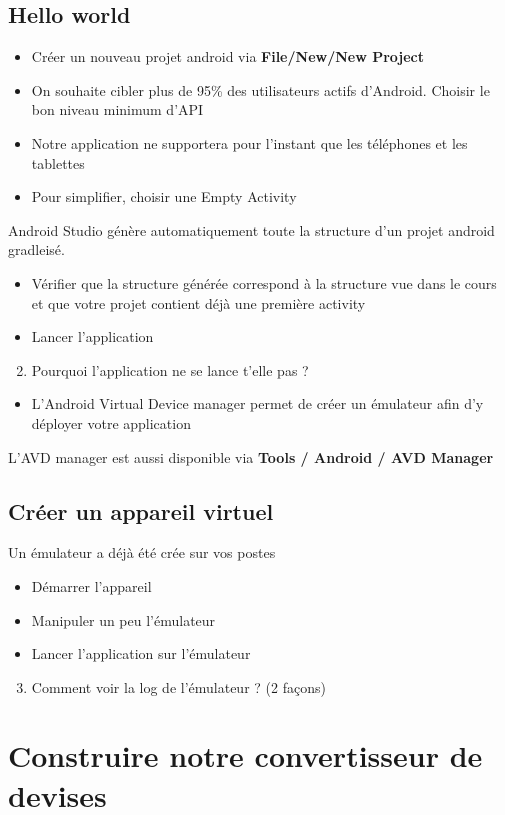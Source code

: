 \documentclass{article}
\begin{document}
\subsection{Hello world}
\begin{itemize}
\item Créer un nouveau projet android via \textbf{File/New/New Project}
\item On souhaite cibler plus de 95\% des utilisateurs actifs d'Android. Choisir
le bon niveau minimum d'API
\item Notre application ne supportera pour l'instant que les téléphones et les
tablettes
\item Pour simplifier, choisir une Empty Activity
\end{itemize}
Android Studio génère automatiquement toute la structure d'un projet android
gradleisé.
\begin{itemize}
\item Vérifier que la structure générée correspond à la structure vue dans le
cours et que votre projet contient déjà une première activity
\item Lancer l'application
\end{itemize}
\begin{enumerate}
 \setcounter{enumi}{1}
\item Pourquoi l'application ne se lance t'elle pas ?
\end{enumerate}
\begin{itemize}
\item L'Android Virtual Device manager permet de créer un émulateur afin d'y
déployer votre application
\end{itemize}
L'AVD manager est aussi disponible via \textbf{Tools / Android / AVD Manager}
\subsection{Créer un appareil virtuel}
Un émulateur a déjà été crée sur vos postes
\begin{itemize}
\item Démarrer l'appareil
\item Manipuler un peu l'émulateur
\item Lancer l'application sur l'émulateur
\end{itemize}
\begin{enumerate}
 \setcounter{enumi}{2}
\item Comment voir la log de l'émulateur ? (2 façons)
\end{enumerate}
\section{Construire notre convertisseur de devises}
\end{document}
